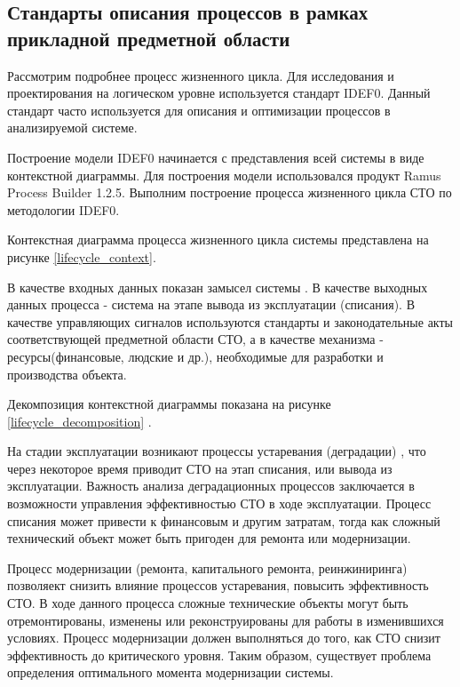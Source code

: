 \subsection{Стандарты описания процессов в рамках прикладной предметной области}

Рассмотрим подробнее процесс жизненного цикла. 
Для исследования и проектирования на логическом уровне используется стандарт IDEF0. 
Данный стандарт часто используется для описания и оптимизации процессов в анализируемой системе. 

Построение модели IDEF0 начинается с представления всей системы в виде контекстной диаграммы.
Для построения модели использовался продукт Ramus Process Builder 1.2.5. 
Выполним построение процесса жизненного цикла СТО по методологии IDEF0. 

Контекстная диаграмма процесса жизненного цикла системы представлена на рисунке \ref{lifecycle_context}.

В качестве входных данных показан замысел системы \cite{Dagabyan}. В качестве выходных данных процесса - система на этапе вывода из эксплуатации (списания).
В качестве управляющих сигналов используются стандарты и законодательные акты соответствующей предметной области СТО, а в качестве механизма - ресурсы(финансовые, людские и др.), необходимые для разработки и производства объекта.

Декомпозиция контекстной диаграммы показана на рисунке \ref{lifecycle_decomposition}
.

На стадии эксплуатации возникают процессы устаревания (деградации) \cite{Miroshnikova, Serpokrylov}, что через некоторое время приводит СТО на этап списания, или вывода из эксплуатации.
Важность анализа деградационных процессов заключается в возможности управления эффективностью СТО в ходе эксплуатации.
Процесс списания может привести к финансовым и другим затратам, тогда как сложный технический объект может быть пригоден для ремонта или модернизации.

Процесс модернизации (ремонта, капитального ремонта, реинжиниринга) позволяект снизить влияние процессов устаревания, 
повысить эффективность СТО. В ходе данного процесса сложные технические объекты могут быть отремонтированы, изменены или реконструированы для работы в изменившихся условиях.
Процесс модернизации должен выполняться до того, как СТО снизит эффективность до критического уровня.
Таким образом, существует проблема определения оптимального момента модернизации системы.

